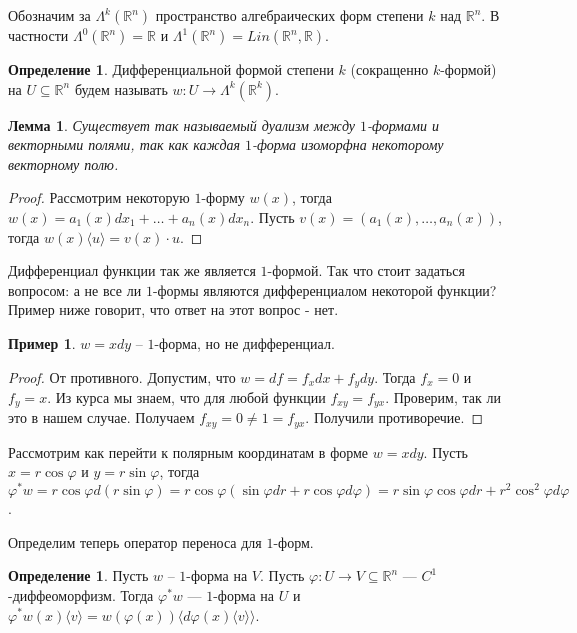 \documentclass[a5paper]{article}
\newcounter{through}
\theoremstyle{plain}
\newtheorem{lemma}[through]{Лемма}
\theoremstyle{definition}
\newtheorem{definition}[through]{Определение}
\newtheorem{example}[through]{Пример}
\numberwithin{through}{section}
\numberwithin{equation}{section}
\begin{document}
Обозначим за $\Lambda^k(\mathbb{R}^n)$ пространство алгебраических форм степени $k$ над $\mathbb{R}^n$. В частности $\Lambda^0(\mathbb{R}^n)=\mathbb{R}$ и $\Lambda^1(\mathbb{R}^n)=Lin(\mathbb{R}^n, \mathbb{R})$.

\begin{definition}
	Дифференциальной формой степени $k$ (сокращенно $k$-формой) на $U \subseteq \mathbb{R}^n$ будем называть $w : U \to \Lambda^k(\mathbb{R}^k)$.
\end{definition}

\begin{lemma}
	Существует так называемый дуализм между $1$-формами и векторными полями, так как каждая $1$-форма изоморфна некоторому векторному полю.
\end{lemma}

\begin{proof}
	Рассмотрим некоторую $1$-форму $w(x)$, тогда $w(x)=a_1(x) dx_1 + \ldots + a_n(x) dx_n$. Пусть $v(x) = (a_1(x), \ldots, a_n(x))$, тогда $w(x) \langle u \rangle = v(x) \cdot u$. 
\end{proof}

Дифференциал функции так же является $1$-формой. Так что стоит задаться вопросом: а не все ли $1$-формы являются дифференциалом некоторой функции? Пример ниже говорит, что ответ на этот вопрос - нет.

\begin{example}
	$w=xdy$ -- $1$-форма, но не дифференциал.
\end{example}

\begin{proof}
	От противного. Допустим, что $w=df=f_x dx + f_y dy$. Тогда $f_x = 0$ и $f_y = x$. Из курса мы знаем, что для любой функции $f_{xy}=f_{yx}$. Проверим, так ли это в нашем случае. Получаем $f_{xy} = 0 \not = 1 = f_{yx}$. Получили противоречие.
\end{proof}

Рассмотрим как перейти к полярным координатам в форме 	$w=xdy$. Пусть $x = r \cos\varphi$ и $y = r \sin\varphi$, тогда $\varphi^* w = r\cos\varphi d(r\sin\varphi) = r\cos\varphi(\sin\varphi dr + r\cos\varphi d\varphi)=r\sin\varphi\cos\varphi dr + r^2 \cos^2 \varphi d \varphi$.

Определим теперь оператор переноса для $1$-форм.

\begin{definition}
	Пусть $w$ -- $1$-форма на $V$. Пусть $\varphi : U \to V \subseteq \mathbb{R}^n$ --- $C^1$-диффеоморфизм. Тогда $\varphi^{*}w$ --- $1$-форма на $U$ и $\varphi^{*} w(x) \langle v \rangle = w(\varphi(x)) \langle d \varphi(x) \langle v \rangle \rangle$.
\end{definition}
\end{document}
